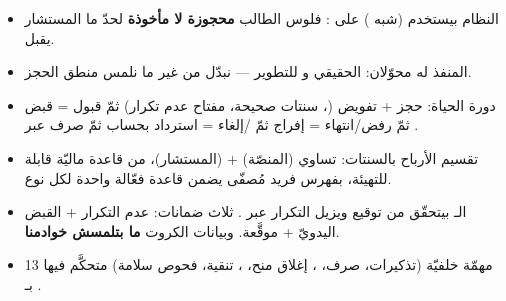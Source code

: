 \begin{summary}
\begin{itemize}
\item النظام بيستخدم  (شبه ) على :
  فلوس الطالب \textbf{محجوزة لا مأخوذة} لحدّ ما المستشار يقبل.
\item المنفذ  له محوّلان:  الحقيقي و
   للتطوير — نبدّل من غير ما نلمس منطق الحجز.
\item دورة الحياة: حجز + تفويض (، سنتات صحيحة، مفتاح عدم تكرار)
  ثمّ قبول = قبض ثمّ رفض/انتهاء = إفراج ثمّ /إلغاء = استرداد بحساب
   ثمّ صرف عبر .
\item تقسيم الأرباح بالسنتات:  تساوي 
  (المنصّة) +  (المستشار)، من قاعدة ماليّة قابلة للتهيئة،
  بفهرس فريد مُصفّى يضمن قاعدة فعّالة واحدة لكل نوع.
\item الـ  بيتحقّق من توقيع  ويزيل التكرار عبر
  . ثلاث ضمانات: عدم التكرار + القبض اليدويّ + 
  موقَّعة. وبيانات الكروت \textbf{ما بتلمسش خوادمنا}.
\item 13 مهمّة  خلفيّة (تذكيرات، صرف، ، إغلاق منح،
  ، تنقية، فحوص سلامة) متحكَّم فيها بـ .
\end{itemize}
\end{summary}
